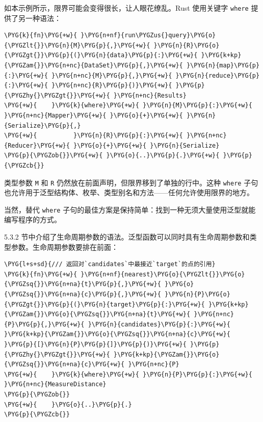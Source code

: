 如本示例所示，限界可能会变得很长，让人眼花缭乱。Rust 使用关键字 \texttt{where} 提供了另一种语法：

\begin{Verbatim}[commandchars=\\\{\},breaklines=true,breakanywhere=true,fontsize=\codefont,xleftmargin=17bp]
\PYG{k}{fn}\PYG{+w}{ }\PYG{n+nf}{run\PYGZus{}query}\PYG{o}{\PYGZlt{}}\PYG{n}{M}\PYG{p}{,}\PYG{+w}{ }\PYG{n}{R}\PYG{o}{\PYGZgt{}}\PYG{p}{(}\PYG{n}{data}\PYG{p}{:}\PYG{+w}{ }\PYG{k+kp}{\PYGZam{}}\PYG{n+nc}{DataSet}\PYG{p}{,}\PYG{+w}{ }\PYG{n}{map}\PYG{p}{:}\PYG{+w}{ }\PYG{n+nc}{M}\PYG{p}{,}\PYG{+w}{ }\PYG{n}{reduce}\PYG{p}{:}\PYG{+w}{ }\PYG{n+nc}{R}\PYG{p}{)}\PYG{+w}{ }\PYG{p}{\PYGZhy{}\PYGZgt{}}\PYG{+w}{ }\PYG{n+nc}{Results}
\PYG{+w}{    }\PYG{k}{where}\PYG{+w}{ }\PYG{n}{M}\PYG{p}{:}\PYG{+w}{ }\PYG{n+nc}{Mapper}\PYG{+w}{ }\PYG{o}{+}\PYG{+w}{ }\PYG{n}{Serialize}\PYG{p}{,}
\PYG{+w}{          }\PYG{n}{R}\PYG{p}{:}\PYG{+w}{ }\PYG{n+nc}{Reducer}\PYG{+w}{ }\PYG{o}{+}\PYG{+w}{ }\PYG{n}{Serialize}
\PYG{p}{\PYGZob{}}\PYG{+w}{ }\PYG{o}{..}\PYG{p}{.}\PYG{+w}{ }\PYG{p}{\PYGZcb{}}
\end{Verbatim}

类型参数 \texttt{M} 和 \texttt{R} 仍然放在前面声明，但限界移到了单独的行中。这种 \texttt{where} 子句也允许用于泛型结构体、枚举、类型别名和方法——任何允许使用限界的地方。

当然，替代 \texttt{where} 子句的最佳方案是保持简单：找到一种无须大量使用泛型就能编写程序的方式。

5.3.2 节中介绍了生命周期参数的语法。泛型函数可以同时具有生命周期参数和类型参数。生命周期参数要排在前面：

\begin{Verbatim}[commandchars=\\\{\},breaklines=true,breakanywhere=true,fontsize=\codefont,xleftmargin=17bp]
\PYG{l+s+sd}{/// 返回对`candidates`中最接近`target`的点的引用}
\PYG{k}{fn}\PYG{+w}{ }\PYG{n+nf}{nearest}\PYG{o}{\PYGZlt{}}\PYG{o}{\PYGZsq{}}\PYG{n+na}{t}\PYG{p}{,}\PYG{+w}{ }\PYG{o}{\PYGZsq{}}\PYG{n+na}{c}\PYG{p}{,}\PYG{+w}{ }\PYG{n}{P}\PYG{o}{\PYGZgt{}}\PYG{p}{(}\PYG{n}{target}\PYG{p}{:}\PYG{+w}{ }\PYG{k+kp}{\PYGZam{}}\PYG{o}{\PYGZsq{}}\PYG{n+na}{t}\PYG{+w}{ }\PYG{n+nc}{P}\PYG{p}{,}\PYG{+w}{ }\PYG{n}{candidates}\PYG{p}{:}\PYG{+w}{ }\PYG{k+kp}{\PYGZam{}}\PYG{o}{\PYGZsq{}}\PYG{n+na}{c}\PYG{+w}{ }\PYG{p}{[}\PYG{n}{P}\PYG{p}{]}\PYG{p}{)}\PYG{+w}{ }\PYG{p}{\PYGZhy{}\PYGZgt{}}\PYG{+w}{ }\PYG{k+kp}{\PYGZam{}}\PYG{o}{\PYGZsq{}}\PYG{n+na}{c}\PYG{+w}{ }\PYG{n+nc}{P}
\PYG{+w}{    }\PYG{k}{where}\PYG{+w}{ }\PYG{n}{P}\PYG{p}{:}\PYG{+w}{ }\PYG{n+nc}{MeasureDistance}
\PYG{p}{\PYGZob{}}
\PYG{+w}{    }\PYG{o}{..}\PYG{p}{.}
\PYG{p}{\PYGZcb{}}
\end{Verbatim}

